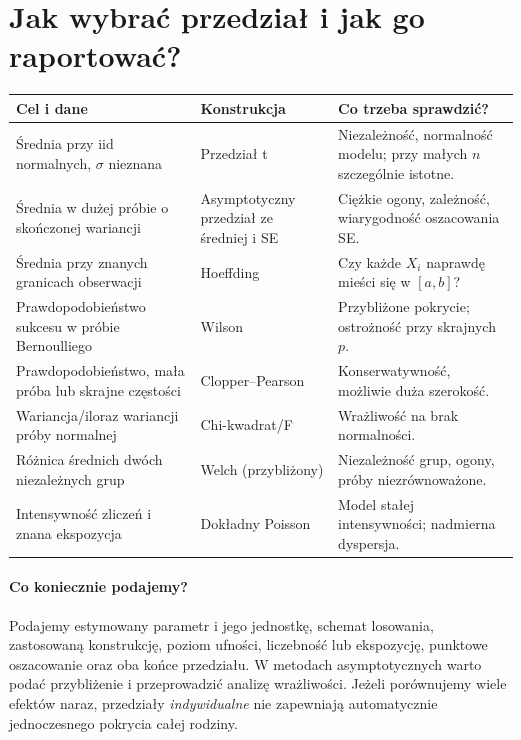\section{Jak wybrać przedział i jak go raportować?}
\begin{center}\small
\begin{tabular}{>{\raggedright\arraybackslash}p{}>{\raggedright\arraybackslash}p{}>{\raggedright\arraybackslash}p{}}
\toprule
\textbf{Cel i dane} & \textbf{Konstrukcja} & \textbf{Co trzeba sprawdzić?}\\
\midrule
Średnia przy iid normalnych, $\sigma$ nieznana & Przedział t & Niezależność, normalność modelu; przy małych $n$ szczególnie istotne.\\
Średnia w dużej próbie o skończonej wariancji & Asymptotyczny przedział ze średniej i SE & Ciężkie ogony, zależność, wiarygodność oszacowania SE.\\
Średnia przy znanych granicach obserwacji & Hoeffding & Czy każde $X_i$ naprawdę mieści się w $[a,b]$?\\
Prawdopodobieństwo sukcesu w próbie Bernoulliego & Wilson & Przybliżone pokrycie; ostrożność przy skrajnych $p$.\\
Prawdopodobieństwo, mała próba lub skrajne częstości & Clopper--Pearson & Konserwatywność, możliwie duża szerokość.\\
Wariancja/iloraz wariancji próby normalnej & Chi-kwadrat/F & Wrażliwość na brak normalności.\\
Różnica średnich dwóch niezależnych grup & Welch (przybliżony) & Niezależność grup, ogony, próby niezrównoważone.\\
Intensywność zliczeń i znana ekspozycja & Dokładny Poisson & Model stałej intensywności; nadmierna dyspersja.\\
\bottomrule
\end{tabular}
\end{center}

\paragraph{Co koniecznie podajemy?}
Podajemy estymowany parametr i jego jednostkę, schemat
losowania, zastosowaną konstrukcję, poziom ufności,
liczebność lub ekspozycję, punktowe oszacowanie oraz
oba końce przedziału. W metodach asymptotycznych warto
podać przybliżenie i przeprowadzić analizę wrażliwości.
Jeżeli porównujemy wiele efektów naraz, przedziały
\emph{indywidualne} nie zapewniają automatycznie
jednoczesnego pokrycia całej rodziny.

